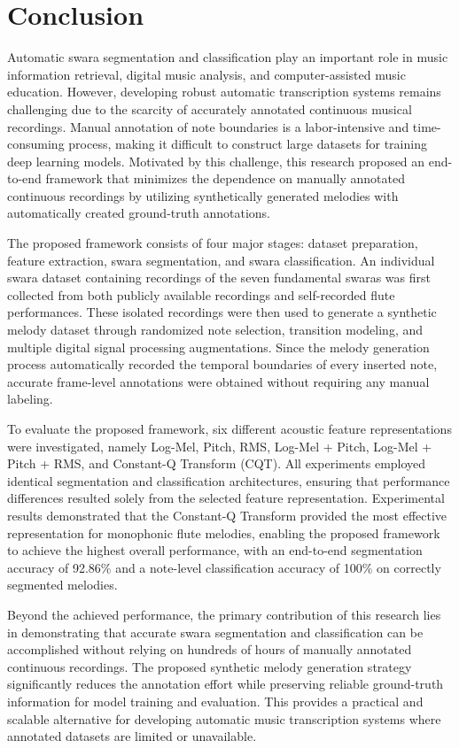 \chapter{Conclusion}
\label{ch:conclusion}

Automatic swara segmentation and classification play an important role in music information retrieval, digital music analysis, and computer-assisted music education. However, developing robust automatic transcription systems remains challenging due to the scarcity of accurately annotated continuous musical recordings. Manual annotation of note boundaries is a labor-intensive and time-consuming process, making it difficult to construct large datasets for training deep learning models. Motivated by this challenge, this research proposed an end-to-end framework that minimizes the dependence on manually annotated continuous recordings by utilizing synthetically generated melodies with automatically created ground-truth annotations.

The proposed framework consists of four major stages: dataset preparation, feature extraction, swara segmentation, and swara classification. An individual swara dataset containing recordings of the seven fundamental swaras was first collected from both publicly available recordings and self-recorded flute performances. These isolated recordings were then used to generate a synthetic melody dataset through randomized note selection, transition modeling, and multiple digital signal processing augmentations. Since the melody generation process automatically recorded the temporal boundaries of every inserted note, accurate frame-level annotations were obtained without requiring any manual labeling.

To evaluate the proposed framework, six different acoustic feature representations were investigated, namely Log-Mel, Pitch, RMS, Log-Mel + Pitch, Log-Mel + Pitch + RMS, and Constant-Q Transform (CQT). All experiments employed identical segmentation and classification architectures, ensuring that performance differences resulted solely from the selected feature representation. Experimental results demonstrated that the Constant-Q Transform provided the most effective representation for monophonic flute melodies, enabling the proposed framework to achieve the highest overall performance, with an end-to-end segmentation accuracy of 92.86\% and a note-level classification accuracy of 100\% on correctly segmented melodies.

Beyond the achieved performance, the primary contribution of this research lies in demonstrating that accurate swara segmentation and classification can be accomplished without relying on hundreds of hours of manually annotated continuous recordings. The proposed synthetic melody generation strategy significantly reduces the annotation effort while preserving reliable ground-truth information for model training and evaluation. This provides a practical and scalable alternative for developing automatic music transcription systems where annotated datasets are limited or unavailable.

